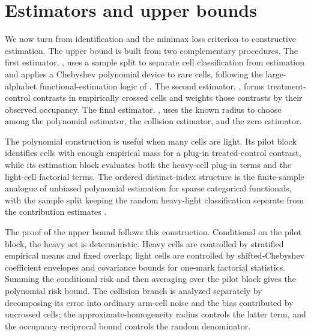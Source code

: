 \section{Estimators and upper bounds}

We now turn from identification and the minimax loss criterion to constructive estimation. The upper bound is built from two complementary procedures. The first estimator, , uses a sample split to separate cell classification from estimation and applies a Chebyshev polynomial device to rare cells, following the large-alphabet functional-estimation logic of \citet{JiaoVenkatHanWeissman2015,WuYang2016Entropy}. The second estimator, , forms treatment-control contrasts in empirically crossed cells and weights those contrasts by their observed occupancy. The final estimator, , uses the known radius to choose among the polynomial estimator, the collision estimator, and the zero estimator.

The polynomial construction is useful when many cells are light. Its pilot block identifies cells with enough empirical mass for a plug-in treated-control contrast, while its estimation block evaluates both the heavy-cell plug-in terms and the light-cell factorial terms. The ordered distinct-index structure is the finite-sample analogue of unbiased polynomial estimation for sparse categorical functionals, with the sample split keeping the random heavy-light classification separate from the contribution estimates \citep{Hoeffding1948,Serfling1980}.

The proof of the upper bound follows this construction. Conditional on the pilot block, the heavy set is deterministic. Heavy cells are controlled by stratified empirical means and fixed overlap; light cells are controlled by shifted-Chebyshev coefficient envelopes and covariance bounds for one-mark factorial statistics. Summing the conditional risk and then averaging over the pilot block gives the polynomial risk bound. The collision branch is analyzed separately by decomposing its error into ordinary arm-cell noise and the bias contributed by uncrossed cells; the approximate-homogeneity radius controls the latter term, and the occupancy reciprocal bound controls the random denominator.

